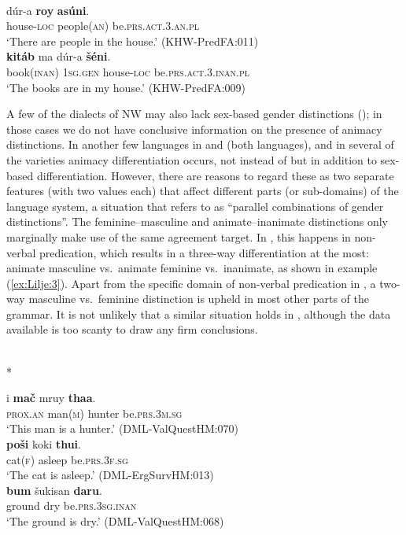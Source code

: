 \documentclass[output=collectionpaper]{langsci/langscibook}
\begin{document}
\ea
\label{ex:Lilje:2}
\\
\begin{xlist}
\ex
\gll dúr-a \textbf{roy}  \textbf{asúni}.     \\
house-\textsc{loc} people(\textsc{an}) be\textsc{.prs.act.3.an.}\textsc{pl}     \\
\glt `There are people in the house.' (KHW-PredFA:011)\\
\ex
\gll \textbf{kitáb}  ma dúr-a  \textbf{šéni}.    \\
book(\textsc{inan}) \textsc{1sg.gen} house-\textsc{loc} be\textsc{.prs.act.3.inan.pl}    \\
\glt `The books are in my house.' (KHW-PredFA:009)\\
\end{xlist}
\z

A few of the dialects of NW  may also lack sex-based gender distinctions (\citealt[150--151]{Morgenstierne1967}); in those cases we do not have conclusive information on the presence of animacy distinctions. In another few languages \textendash{} in  and  (both  languages), and in several of the  varieties \textendash{} animacy differentiation occurs, not instead of but in addition to sex-based differentiation. However, there are reasons to regard these as two separate features (with two values each) that affect different parts (or sub-domains) of the language system, a situation that \citet[581--582]{Dahl2000} refers to as ``parallel combinations of gender distinctions''. The feminine--masculine and animate--inanimate distinctions only marginally make use of the same agreement target. In , this happens in non-verbal predication, which results in a three-way differentiation at the most: animate masculine vs.\ animate feminine vs.\ inanimate, as shown in example (\ref{ex:Lilje:3}). Apart from the specific domain of non-verbal predication in , a two-way masculine vs.\ feminine distinction is upheld in most other parts of the grammar. It is not unlikely that a similar situation holds in , although the data available is too scanty to draw any firm conclusions.

\ea
\label{ex:Lilje:3}
\\*
\begin{xlist}
\ex
\gll i \textbf{mač} mruy \textbf{thaa}.    \\
\textsc{prox.an} man(\textsc{m}) hunter be\textsc{.prs.3m.sg}    \\
\glt `This man is a hunter.' (DML-ValQuestHM:070)\\
\ex
\gll \textbf{poši} koki \textbf{thui}.     \\
cat(\textsc{f}) asleep be.\textsc{prs.3f.sg}     \\
\glt `The cat is asleep.' (DML-ErgSurvHM:013)\\
\ex
\gll \textbf{bum} šukisan \textbf{daru}.     \\
ground dry be.\textsc{prs.3sg.inan}     \\
\glt `The ground is dry.' (DML-ValQuestHM:068)\\
\end{xlist}
\z
\end{document}
